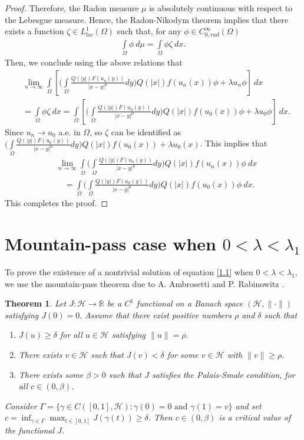 \documentclass[11pt]{amsart}
\numberwithin{equation}{section}
\newtheorem{thm}{Theorem}[section]
\newcommand{\R}{\mathbb{R}}
\newcommand{\1}{\frac{1}{2}}
\begin{document}
\begin{proof}
		Therefore, the Radon measure $\mu$ is absolutely continuous with respect to the Lebesgue measure. Hence, the Radon-Nikodym theorem implies that there exists a function $\zeta \in L^1_{loc}(\Omega)$ such that, for any $\phi \in C_{0,rad}^\infty(\Omega)$
		\begin{align*}
			\int\limits_\Omega \phi \ d\mu = \int\limits_\Omega \phi \zeta \ dx.
		\end{align*}
		Then, we conclude using the above relations that
		\begin{align*}
			&\lim_{n\to \infty} \int\limits_\Omega \left[ \Bigg( \int\limits_\Omega \frac{Q(|y|)F(u_n(y))}{|x-y|^\mu}dy\Bigg) Q(|x|)f(u_n(x)) \phi + \lambda u_n \phi \right]\ dx \\
			&= \int\limits_\Omega \phi \zeta \ dx
			= \int\limits_\Omega \left[\Bigg( \int\limits_\Omega \frac{Q(|y|)F(u_0(y))}{|x-y|^\mu}dy\Bigg) Q(|x|)f(u_0(x)) \phi+ \lambda u_0 \phi\right] \ dx.
		\end{align*}
		Since $u_n \to u_0$ a.e. in $\Omega$, so $\zeta$ can be identified as $\displaystyle\Bigg( \int\limits_\Omega \frac{Q(|y|)F(u_0(y))}{|x-y|^\mu}dy\Bigg)Q(|x|)f(u_0(x)) + \lambda u_0(x)$.
		This implies that
		\begin{align*}
			&\lim_{n\to \infty} \int\limits_\Omega \Bigg( \int\limits_\Omega \frac{Q(|y|)F(u_n(y))}{|x-y|^\mu}dy\Bigg) Q(|x|)f(u_n(x)) \phi\ dx \\
			& \quad=\int\limits_\Omega \Bigg( \int\limits_\Omega \frac{Q(|y|)F(u_0(y))}{|x-y|^\mu}dy\Bigg) Q(|x|)f(u_0(x)) \phi \ dx.
		\end{align*}
		This completes the proof.
	\end{proof}
	
	\section{Mountain-pass case when $0<\lambda<\lambda_1$}
	\label{sec4}
	To prove the existence of a nontrivial solution of equation \eqref{1.1} when $0< \lambda< \lambda_1$, we use the mountain-pass theorem due to A. Ambrosetti and P. Rabinowitz \cite{Ambrosetti}.
	\begin{thm}
		\label{thm4.1}
		Let $J : \mathcal{H} \rightarrow \R$ be a $C^1$ functional on a Banach space $(\mathcal{H}, \|\cdot\|)$ satisfying $J(0)=0.$ Assume that there exist positive numbers $\rho$ and $\delta$ such that
		\begin{enumerate}
			\item[(i)] $J(u)\geq \delta$ for all $u\in \mathcal{H}$ satisfying $\|u\| = \rho$.
			\item[(ii)] There exists $v\in \mathcal{H}$ such that $J(v)<\delta$ for some $v\in \mathcal{H}$ with $\|v\|\geq \rho$.
			\item[(iii)] There exists some $\beta >0$ such that $J$ satisfies the Palais-Smale condition, for all $c\in(0, \beta)$.
		\end{enumerate}
		Consider $\displaystyle\Gamma=\{\gamma\in C([0, 1], \mathcal{H}) : \gamma(0) = 0 \text{ and } \gamma(1) = v\}$ and set $\displaystyle c = \inf_{\gamma \in \Gamma} \max_{t\in [0,1]}J(\gamma(t)) \geq \delta$. Then $c \in (0, \beta)$ is a critical value of the functional $J$.
	\end{thm}
	
\end{document}

